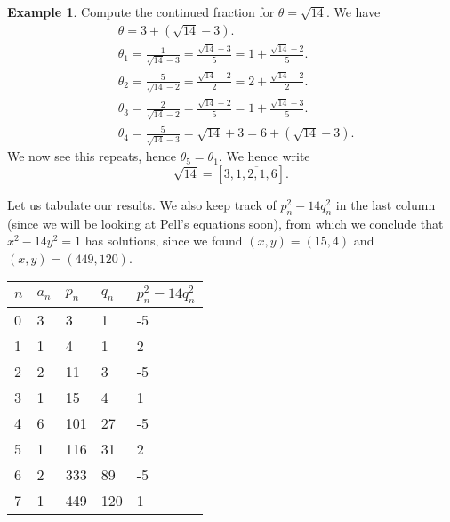 \documentclass{article}
\theoremstyle{definition}
\newtheorem{example}{Example}[section]
\begin{document}
\begin{example}
    Compute the continued fraction for $\theta = \sqrt{14}$. We have   
    \begin{align*}
        &\theta = 3 + (\sqrt{14}-3).\\
        &\theta_1 = \frac{1}{\sqrt{14}-3} = \frac{\sqrt{14}+3}{5} = 1 + \frac{\sqrt{14}-2}{5}.\\
        & \theta_2 = \frac{5}{\sqrt{14}-2} = \frac{\sqrt{14}-2}{2} = 2 + \frac{\sqrt{14}-2}{2}.\\
        &\theta_3 = \frac{2}{\sqrt{14}-2} = \frac{\sqrt{14}+2}{5} = 1 + \frac{\sqrt{14}-3}{5}.\\
        &\theta_4 = \frac{5}{\sqrt{14}-3} = \sqrt{14}+3 = 6 + (\sqrt{14}-3).
    \end{align*}
    We now see this repeats, hence $\theta_5 = \theta_1$. We hence write \[
    \sqrt{14} = [3,\overline{1,2,1,6}].
    \]
\end{example}
Let us tabulate our results. We also keep track of $p_n^2-14q_n^2$ in the last column (since we will be looking at Pell's equations soon), from which we conclude that $x^2-14y^2=1$ has solutions, since we found $(x,y)=(15,4)$ and $(x,y)=(449,120)$.
\begin{center}
    \begin{tabular}{l|llll}
    $n$ & $a_n$ & $p_n$ & $q_n$ & $p_n^2-14q_n^2$\\ \hline
    0 & 3 & 3 & 1 & \hspace{6mm}-5\\
    1 & 1 & 4 & 1 & \hspace{7mm}2\\
    2 & 2 & 11 & 3 & \hspace{6mm}-5\\
    3 & 1 & 15 & 4 & \hspace{7mm}1\\
    4 & 6 & 101 & 27 & \hspace{6mm}-5\\
    5 & 1 & 116 & 31 & \hspace{7mm}2\\
    6 & 2 & 333 & 89 & \hspace{6mm}-5\\
    7 & 1 & 449 & 120 & \hspace{7mm}1\\
    \end{tabular}
\end{center}

\end{document}
